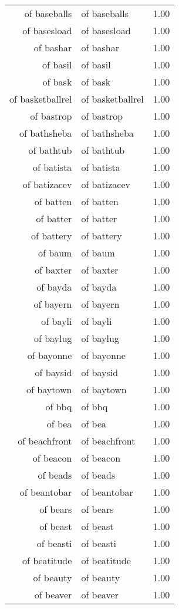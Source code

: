 \begin{table}[ht]
\begin{tabular}{rlr}
  of baseballs & of baseballs & 1.00 \\ 
  of basesload & of basesload & 1.00 \\ 
  of bashar & of bashar & 1.00 \\ 
  of basil & of basil & 1.00 \\ 
  of bask & of bask & 1.00 \\ 
  of basketballrel & of basketballrel & 1.00 \\ 
  of bastrop & of bastrop & 1.00 \\ 
  of bathsheba & of bathsheba & 1.00 \\ 
  of bathtub & of bathtub & 1.00 \\ 
  of batista & of batista & 1.00 \\ 
  of batizacev & of batizacev & 1.00 \\ 
  of batten & of batten & 1.00 \\ 
  of batter & of batter & 1.00 \\ 
  of battery & of battery & 1.00 \\ 
  of baum & of baum & 1.00 \\ 
  of baxter & of baxter & 1.00 \\ 
  of bayda & of bayda & 1.00 \\ 
  of bayern & of bayern & 1.00 \\ 
  of bayli & of bayli & 1.00 \\ 
  of baylug & of baylug & 1.00 \\ 
  of bayonne & of bayonne & 1.00 \\ 
  of baysid & of baysid & 1.00 \\ 
  of baytown & of baytown & 1.00 \\ 
  of bbq & of bbq & 1.00 \\ 
  of bea & of bea & 1.00 \\ 
  of beachfront & of beachfront & 1.00 \\ 
  of beacon & of beacon & 1.00 \\ 
  of beads & of beads & 1.00 \\ 
  of beantobar & of beantobar & 1.00 \\ 
  of bears & of bears & 1.00 \\ 
  of beast & of beast & 1.00 \\ 
  of beasti & of beasti & 1.00 \\ 
  of beatitude & of beatitude & 1.00 \\ 
  of beauty & of beauty & 1.00 \\ 
  of beaver & of beaver & 1.00 \\ 

\end{tabular}
\end{table}
